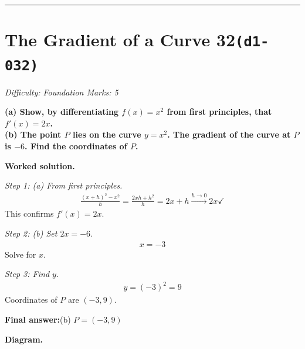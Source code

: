 \documentclass[11pt]{article}
\newcommand{\question}[1]{\par\medskip\noindent\textbf{#1}\par}
\begin{document}
\medskip\hrule

\section*{The Gradient of a Curve 32\quad\small\texttt{(d1-032)}}
\textit{Difficulty: Foundation \quad\textbar\quad Marks: 5}

\question{(a) Show, by differentiating \( f(x) = x^2 \) from first principles, that \( f'(x) = 2x \).\\[3pt]  (b) The point \( P \) lies on the curve \( y = x^2 \). The gradient of the curve at \( P \) is \(-6\). Find the coordinates of \( P \).}

\textbf{Worked solution.}

\textit{Step 1: (a) From first principles.}
\[\begin{gathered}
\frac{(x+h)^2 - x^2}{h} = \frac{2xh + h^2}{h} = 2x + h \xrightarrow{h\to 0} 2x \checkmark
\end{gathered}\]
This confirms \( f'(x) = 2x \).

\textit{Step 2: (b) Set \( 2x = -6 \).}
\[\begin{gathered}
x = -3
\end{gathered}\]
Solve for \( x \).

\textit{Step 3: Find \( y \).}
\[\begin{gathered}
y = (-3)^2 = 9
\end{gathered}\]
Coordinates of \( P \) are \( (-3, 9) \).

\begin{answerbox}
\textbf{Final answer:}\quad (b) \(\displaystyle  P = (-3, 9) \)
\end{answerbox}
\textbf{Diagram.}
\end{document}
